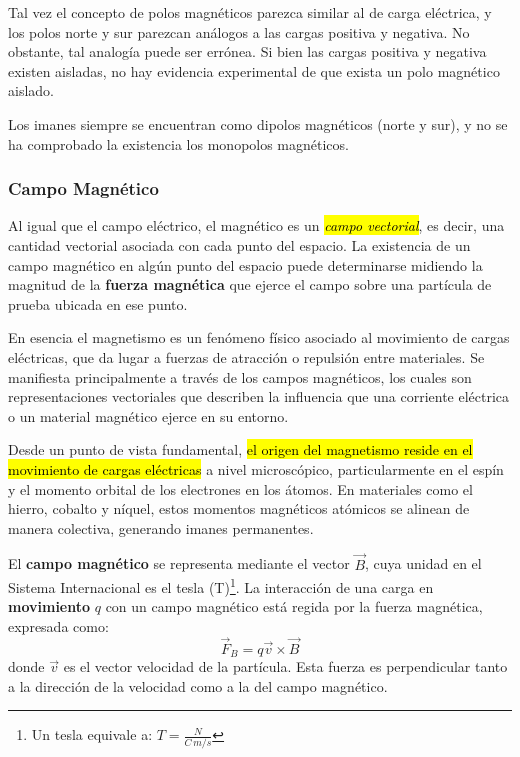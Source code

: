 Tal vez el concepto de polos magnéticos parezca similar al de carga eléctrica, y los polos norte y sur parezcan análogos a las cargas positiva y negativa. No obstante, tal analogía puede ser errónea. Si bien las cargas positiva y negativa existen aisladas, no hay evidencia experimental de que exista un polo magnético aislado.

Los imanes siempre se encuentran como dipolos magnéticos (norte y sur), y no se ha comprobado la existencia los monopolos magnéticos.

\subsubsection{Campo Magnético}

Al igual que el campo eléctrico, el magnético es un \hl{\textit{campo vectorial}}, es decir, una cantidad vectorial asociada con cada punto del espacio. La existencia de un campo magnético en algún punto del espacio puede determinarse midiendo la magnitud de la \textbf{fuerza magnética} que ejerce el campo sobre una partícula de prueba ubicada en ese punto.

En esencia el magnetismo es un fenómeno físico asociado al movimiento de cargas eléctricas, que da lugar a fuerzas de atracción o repulsión entre materiales. Se manifiesta principalmente a través de los campos magnéticos, los cuales son representaciones vectoriales que describen la influencia que una corriente eléctrica o un material magnético ejerce en su entorno.

Desde un punto de vista fundamental, \hl{el origen del magnetismo reside en el movimiento de cargas eléctricas} a nivel microscópico, particularmente en el espín y el momento orbital de los electrones en los átomos. En materiales como el hierro, cobalto y níquel, estos momentos magnéticos atómicos se alinean de manera colectiva, generando imanes permanentes.

El \textbf{campo magnético} se representa mediante el vector \(\vec{B}\), cuya unidad en el Sistema Internacional es el tesla (T)\footnote{Un tesla equivale a: \(T=\frac{N}{C\, m/s}\)}. La interacción de una carga en \textbf{movimiento} \(q\) con un campo magnético está regida por la fuerza magnética, expresada como:
\begin{equation}
  \vec{F}_B = q\vec{v} \times \vec{B}
  \label{eq:fuerza_magnética}
\end{equation}
donde \(\vec{v}\) es el vector velocidad de la partícula. Esta fuerza es perpendicular tanto a la dirección de la velocidad como a la del campo magnético.


